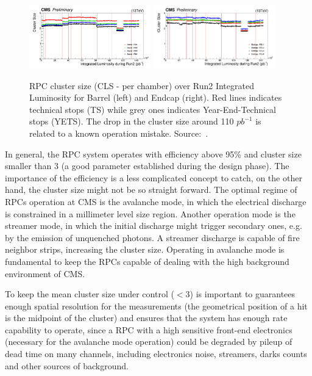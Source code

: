 \begin{figure}[htbp]
    \centering
    \includegraphics[width=0.47\textwidth,keepaspectratio]{figures_and_tables/rpc/performance/barrel_cls_vs_intL.png}
    \includegraphics[width=0.47\textwidth,keepaspectratio]{figures_and_tables/rpc/performance/endcap_cls_vs_intL.png}
    \caption{RPC cluster size (CLS - per chamber) over Run2 Integrated Luminosity for Barrel (left) and Endcap (right). Red lines indicates technical stops (TS) while grey ones indicates Year-End-Technical stops (YETS). The drop in the cluster size around 110 $pb^{-1}$ is related to a known operation mistake. Source:~\cite{rpc_run2_performance}.}
    \label{cls_run2}
\end{figure}

In general, the RPC system operates with efficiency above 95\% and cluster size smaller than 3 (a good parameter established during the design phase). The importance of the efficiency is a less complicated concept to catch, on the other hand, the cluster size might not be so straight forward. The optimal regime of RPCs operation at CMS is the avalanche mode, in which the electrical discharge is constrained in a millimeter level size region. Another operation mode is the streamer mode, in which the initial discharge might trigger secondary ones, e.g. by the emission of unquenched photons. A streamer discharge is capable of fire neighbor strips, increasing the cluster size. Operating in avalanche mode is fundamental to keep the RPCs capable of dealing with the high background environment of CMS. 

To keep the mean cluster size under control ($< 3$) is important to guarantees enough spatial resolution for the measurements (the geometrical position of a hit is the midpoint of the cluster) and ensures that the system has enough rate capability to operate, since a RPC with a high sensitive front-end electronics (necessary for the avalanche mode operation) could be degraded by pileup of dead time on many channels, including electronics noise, streamers, darks counts and other sources of background.

